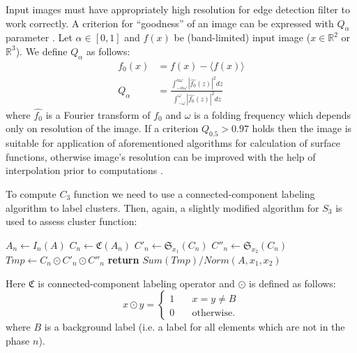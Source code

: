 \documentclass[reprint,amsmath,amssymb,aps,pre,showkeys,showpacs]{revtex4-1}
\begin{document}
Input images must have appropriately high resolution for edge detection filter
to work correctly. A criterion for ``goodness'' of an image can be expressed
with $Q_\alpha$ parameter \cite{samarin2023robust}. Let $\alpha \in [0, 1]$
and $f(x)$ be (band-limited) input image ($x \in \mathbb{R}^2$ or
$\mathbb{R}^3$). We define $Q_\alpha$ as follows:
\begin{equation}
  \begin{aligned}
    f_0(x) &= f(x) - \langle f(x) \rangle \\
    Q_\alpha &= \frac{\int_{-\alpha\omega}^{\alpha\omega} |\hat{f_0}(z)|^2
      dz}{\int_{-\omega}^{\omega} |\hat{f_0}(z)|^2 dz}
  \end{aligned}
\end{equation}
where $\hat{f_0}$ is a Fourier transform of $f_0$ and $\omega$ is a folding
frequency which depends only on resolution of the image. If a criterion
$Q_{0.5} > 0.97$ holds then the image is suitable for application of
aforementioned algorithms for calculation of surface functions, otherwise
image's resolution can be improved with the help of interpolation prior to
computations \cite{samarin2023robust}.

To compute $C_3$ function we need to use a connected-component labeling
algorithm \cite{4728561,PhysRevB.14.3438} to label clusters. Then, again, a
slightly modified algorithm for $S_3$ is used to assess cluster function:
\begin{algorithmic}[1]
  \State $A_n \gets I_n (A)$
  \State $C_n \gets \mathfrak{C}(A_n)$
  \State $C'_n \gets \mathfrak{S}_{x_1}(C_n)$
  \State $C''_n \gets \mathfrak{S}_{x_2}(C_n)$
  \State $Tmp \gets C_n \odot C'_n \odot C''_n$
  \State \textbf{return} $Sum(Tmp) / Norm(A, x_1, x_2)$
  \EndProcedure
\end{algorithmic}
Here $\mathfrak{C}$ is connected-component labeling operator and $\odot$ is
defined as follows:
\begin{equation}
  x \odot y = \left\{
  \begin{array}{ll}
    1 & \quad x = y \ne B \\
    0 & \quad \text{otherwise}.
  \end{array}
  \right.
\end{equation}
where $B$ is a background label (i.e. a label for all elements which are not in
the phase $n$).
\end{document}

